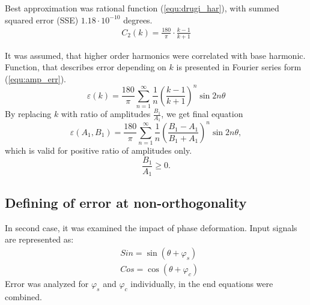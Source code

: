 \documentclass[a4paper]{article}
\begin{document}
Best approximation was rational function  (\ref{equ:drugi_har}), with summed squared error (SSE) $1.18 \cdot 10^{-10}$ degrees.
\begin{eqnarray}
\label{equ:drugi_har}
C_2(k)=\frac{180}{\pi}\cdot\frac{k-1}{k+1}
\end{eqnarray}

It was assumed, that higher order harmonics were correlated with base harmonic. Function, that describes error  depending on $k$ is presented in Fourier series form (\ref{equ:amp_err}).
\begin{equation}
\label{equ:amp_err}
\varepsilon(k) =\frac{180}{\pi}\sum_{n=1}^{\infty}\frac{1}{n}(\frac{k-1}{k+1})^n \sin 2 n \theta
\end{equation}
By replacing $k$ with ratio of amplitudes $\frac{B_1}{A_1}$, we get final equation
\begin{equation}
\label{equ:amp_err2}
\varepsilon(A_1, B_1) =\frac{180}{\pi}\sum_{n=1}^{\infty}\frac{1}{n}(\frac{B_1-A_1}{B_1+A_1})^n \sin 2 n \theta,
\end{equation}
which is valid for positive ratio of amplitudes only.
 $$\frac{B_1}{A_1} \geq 0.$$

\subsection{Defining of error at non-orthogonality}
In second case, it was examined the impact of phase deformation. Input signals are represented as:
\begin{eqnarray}
\label{equ:def_sin_fis}
&Sin = \sin(\theta + \varphi_{s})\\
\label{equ:def_cos_fis}
&Cos =\cos(\theta+\varphi_{c})
\end{eqnarray}
Error was analyzed for $\varphi_s$ and $\varphi_c$ individually, in the end equations were combined.
\end{document}
